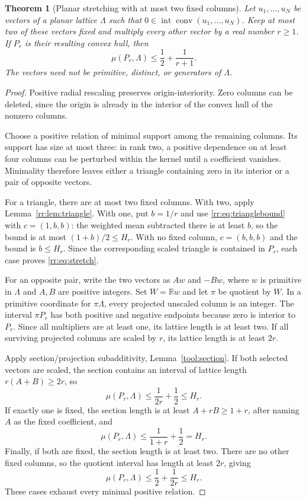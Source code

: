 \documentclass[11pt,a4paper]{article}
\newtheorem{theorem}{Theorem}[section]
\theoremstyle{remark}\newtheorem{remark}[theorem]{Remark}
\DeclareMathOperator{\conv}{conv}
\DeclareMathOperator{\inter}{int}
\newcommand{\R}{\mathbb R}\newcommand{\Z}{\mathbb Z}
\begin{document}
\begin{theorem}[Planar stretching with at most two fixed columns]
\label{rr:thm:stretch}
Let $u_1,\ldots,u_N$ be vectors of a planar lattice $\Lambda$ such
that $0\in\inter\conv(u_1,\ldots,u_N)$.  Keep at most two of these
vectors fixed and multiply every other vector by a real number
$r\ge1$.  If $P_r$ is their resulting convex hull, then
\begin{equation}\label{rr:eq:stretch}
 \mu(P_r,\Lambda)\le\frac12+\frac1{r+1}.
\end{equation}
The vectors need not be primitive, distinct, or generators of
$\Lambda$.
\end{theorem}
\begin{proof}
Positive radial rescaling preserves origin-interiority.  Zero
columns can be deleted, since the origin is already in the interior
of the convex hull of the nonzero columns.

Choose a positive relation of minimal support among the remaining
columns.  Its support has size at most three: in rank two, a
positive dependence on at least four columns can be perturbed
within the kernel until a coefficient vanishes.  Minimality
therefore leaves either a triangle containing zero in its interior
or a pair of opposite vectors.

For a triangle, there are at most two fixed columns.  With two,
apply Lemma~\ref{rr:lem:triangle}.  With one, put $b=1/r$ and
use \eqref{rr:eq:trianglebound} with $c=(1,b,b)$: the weighted
mean subtracted there is at least $b$, so the bound is at most
$(1+b)/2\le H_r$.  With no fixed column, $c=(b,b,b)$ and the
bound is $b\le H_r$.  Since the corresponding scaled triangle is
contained in $P_r$, each case proves \eqref{rr:eq:stretch}.

For an opposite pair, write the two vectors as $Aw$ and $-Bw$,
where $w$ is primitive in $\Lambda$ and $A,B$ are positive
integers.  Set $W=\R w$ and let $\pi$ be quotient by $W$.
In a primitive coordinate for $\pi\Lambda$, every projected
unscaled column is an integer.  The interval $\pi P_r$ has both
positive and negative endpoints because zero is interior to
$P_r$.  Since all multipliers are at least one, its lattice
length is at least two.  If all surviving projected columns are
scaled by $r$, its lattice length is at least $2r$.

Apply section/projection subadditivity,
Lemma~\ref{tool:section}.  If both selected vectors are scaled,
the section contains an interval of lattice length
$r(A+B)\ge2r$, so
\[
 \mu(P_r,\Lambda)\le\frac1{2r}+\frac12\le H_r.
\]
If exactly one is fixed, the section length is at least
$A+rB\ge1+r$, after naming $A$ as the fixed coefficient, and
\[
 \mu(P_r,\Lambda)\le\frac1{1+r}+\frac12=H_r.
\]
Finally, if both are fixed, the section length is at least two.
There are no other fixed columns, so the quotient interval has
length at least $2r$, giving
\[
 \mu(P_r,\Lambda)\le\frac12+\frac1{2r}\le H_r.
\]
These cases exhaust every minimal positive relation.
\end{proof}
\end{document}
